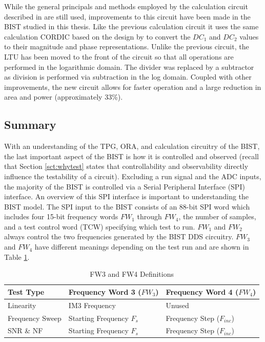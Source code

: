 \documentclass[12pt]{report}
\begin{document}
While the general principals and methods employed by the calculation circuit described in \cite{joey} are still used, improvements to this circuit have been made in the BIST studied in this thesis.  Like the previous calculation circuit it uses the same calculation CORDIC based on the design by \cite{joey} to convert the $DC_1$ and $DC_2$ values to their magnitude and phase representations.  Unlike the previous circuit, the LTU has been moved to the front of the circuit so that all operations are performed in the logarithmic domain.  The divider was replaced by a subtractor as division is performed via subtraction in the log domain.  Coupled with other improvements, the new circuit allows for faster operation and a large reduction in area and power (approximately 33\%).

\subsection{Summary}
\label{sct:bkgsum}
With an understanding of the TPG, ORA, and calculation circuitry of the BIST, the last important aspect of the BIST is how it is controlled and observed (recall that Section \ref{sct:whytest} states that controllability and observability directly influence the testability of a circuit).  Excluding a run signal and the ADC inputs, the majority of the BIST is controlled via a Serial Peripheral Interface (SPI) interface.  An overview of this SPI interface is important to understanding the BIST model.  The SPI input to the BIST consists of an 88-bit SPI word which includes four 15-bit frequency words $FW_1$ through $FW_4$, the number of samples, and a test control word (TCW) specifying which test to run.  $FW_1$ and $FW_2$ always control the two frequencies generated by the BIST DDS circuitry.  $FW_3$ and $FW_4$ have different meanings depending on the test run and are shown in Table \ref{tbl:fw34}.  
\begin{table}
  \caption{FW3 and FW4 Definitions}
  \begin{center}
    \begin{tabular}{|l|l|l|}
      \hline
      Test Type & Frequency Word 3 ($FW_3$) & Frequency Word 4 ($FW_4$) \\ \hline
      Linearity & IM3 Frequency & Unused \\ \hline
      Frequency Sweep & Starting Frequency $F_s$ & Frequency Step ($F_{inc}$) \\ \hline
      SNR \& NF & Starting Frequency $F_s$ & Frequency Step ($F_{inc}$) \\ \hline
    \end{tabular}
  \end{center}
  \label{tbl:fw34}
\end{table}
\end{document}
